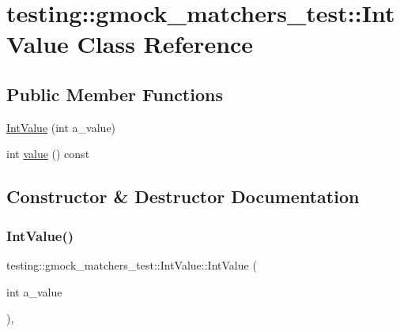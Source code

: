 \hypertarget{classtesting_1_1gmock__matchers__test_1_1_int_value}{}\section{testing\+:\+:gmock\+\_\+matchers\+\_\+test\+:\+:Int\+Value Class Reference}
\label{classtesting_1_1gmock__matchers__test_1_1_int_value}
\subsection*{Public Member Functions}
\begin{DoxyCompactItemize}
\item 
\hyperlink{classtesting_1_1gmock__matchers__test_1_1_int_value_a2a294fcf7ad9f4d9888c4e6194fcd848}{Int\+Value} (int a\+\_\+value)
\item 
int \hyperlink{classtesting_1_1gmock__matchers__test_1_1_int_value_a6da000ea8ff787591e07ffaa3c1027d4}{value} () const
\end{DoxyCompactItemize}


\subsection{Constructor \& Destructor Documentation}
\mbox{\label{classtesting_1_1gmock__matchers__test_1_1_int_value_a2a294fcf7ad9f4d9888c4e6194fcd848}} 
\subsubsection{\texorpdfstring{Int\+Value()}{IntValue()}}
{\footnotesize\ttfamily testing\+::gmock\+\_\+matchers\+\_\+test\+::\+Int\+Value\+::\+Int\+Value (\begin{DoxyParamCaption}\item[{int}]{a\+\_\+value }\end{DoxyParamCaption})\hspace{0.3cm}{\ttfamily [inline]}, {\ttfamily [explicit]}}



